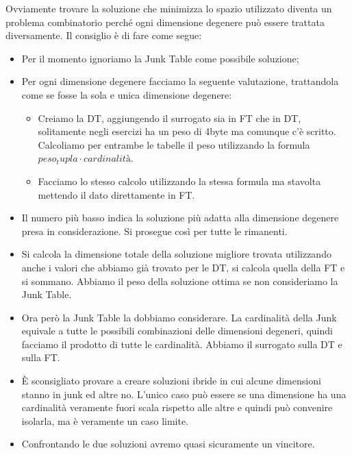 Ovviamente trovare la soluzione che minimizza lo spazio utilizzato diventa un problema combinatorio perché ogni dimensione degenere può essere trattata diversamente. Il consiglio è di fare come segue:
\begin{itemize}
	\item Per il momento ignoriamo la Junk Table come possibile soluzione;
	\item Per ogni dimensione degenere facciamo la seguente valutazione, trattandola come se fosse la sola e unica dimensione degenere:
	\begin{itemize}
		\item Creiamo la DT, aggiungendo il surrogato sia in FT che in DT, solitamente negli esercizi ha un peso di 4byte ma comunque c'è scritto. Calcoliamo per entrambe le tabelle il peso utilizzando la formula $peso_tupla \cdot cardinalità$.
		\item Facciamo lo stesso calcolo utilizzando la stessa formula ma stavolta mettendo il dato direttamente in FT.
	\end{itemize}
	\item Il numero più basso indica la soluzione più adatta alla dimensione degenere presa in considerazione. Si prosegue così per tutte le rimanenti.
	\item Si calcola la dimensione totale della soluzione migliore trovata utilizzando anche i valori che abbiamo già trovato per le DT, si calcola quella della FT e si sommano. Abbiamo il peso della soluzione ottima se non consideriamo la Junk Table.
	\item Ora però la Junk Table la dobbiamo considerare. La cardinalità della Junk equivale a tutte le possibili combinazioni delle dimensioni degeneri, quindi facciamo il prodotto di tutte le cardinalità. Abbiamo il surrogato sulla DT e sulla FT.
	\item È sconsigliato provare a creare soluzioni ibride in cui alcune dimensioni stanno in junk ed altre no. L'unico caso può essere se una dimensione ha una cardinalità veramente fuori scala rispetto alle altre e quindi può convenire isolarla, ma è veramente un caso limite.
	\item Confrontando le due soluzioni avremo quasi sicuramente un vincitore.
\end{itemize}

